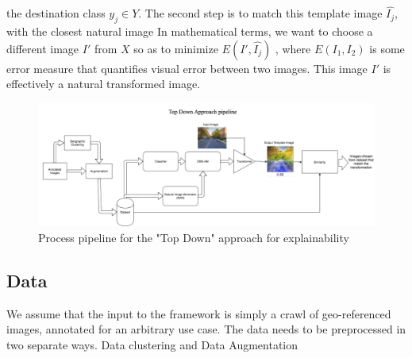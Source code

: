 the destination class $y_j \in Y$. The second step is to 
match this template image $\hat{I_j}$, 
with the closest natural image
 In mathematical terms, we want to choose a different image $I'$ from $X$ so as to minimize $E(I' , \hat{I_j} )$ , where $E(I_1, I_2)$ is some error measure that quantifies visual error between two images. This image $I'$ is effectively a natural transformed image.
 \begin{figure}[ht]
	\centering
	\includegraphics[width=1.8\columnwidth]{Plot/ExplainabilityPipeline_abstract.png}
	\caption{Process pipeline for the "Top Down" approach for explainability}
    \label{fig:pipeline}
\end{figure}

\subsection{Data}
We assume that the input to the framework is simply a crawl of geo-referenced images, annotated for an arbitrary use case. The data needs to be preprocessed in two separate ways. Data clustering and Data Augmentation
